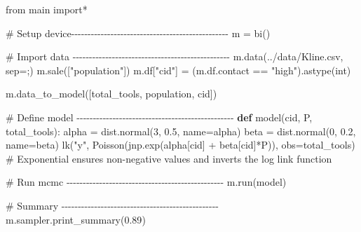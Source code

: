 \documentclass[
  letterpaper,
  DIV=11,
  numbers=noendperiod]{scrreprt}
\newenvironment{Shaded}{\begin{snugshade}}{\end{snugshade}}
\newcommand{\BuiltInTok}[1]{\textcolor[rgb]{0.00,0.23,0.31}{#1}}
\newcommand{\CommentTok}[1]{\textcolor[rgb]{0.37,0.37,0.37}{#1}}
\newcommand{\DecValTok}[1]{\textcolor[rgb]{0.68,0.00,0.00}{#1}}
\newcommand{\FloatTok}[1]{\textcolor[rgb]{0.68,0.00,0.00}{#1}}
\newcommand{\ImportTok}[1]{\textcolor[rgb]{0.00,0.46,0.62}{#1}}
\newcommand{\KeywordTok}[1]{\textcolor[rgb]{0.00,0.23,0.31}{\textbf{#1}}}
\newcommand{\NormalTok}[1]{\textcolor[rgb]{0.00,0.23,0.31}{#1}}
\newcommand{\OperatorTok}[1]{\textcolor[rgb]{0.37,0.37,0.37}{#1}}
\newcommand{\StringTok}[1]{\textcolor[rgb]{0.13,0.47,0.30}{#1}}
\begin{document}
\begin{Shaded}
\begin{Highlighting}[]
\ImportTok{from}\NormalTok{ main }\ImportTok{import}\OperatorTok{*}

\CommentTok{\# Setup device{-}{-}{-}{-}{-}{-}{-}{-}{-}{-}{-}{-}{-}{-}{-}{-}{-}{-}{-}{-}{-}{-}{-}{-}{-}{-}{-}{-}{-}{-}{-}{-}{-}{-}{-}{-}{-}{-}{-}{-}{-}{-}{-}{-}{-}{-}{-}{-}}
\NormalTok{m }\OperatorTok{=}\NormalTok{ bi()}

\CommentTok{\# Import data {-}{-}{-}{-}{-}{-}{-}{-}{-}{-}{-}{-}{-}{-}{-}{-}{-}{-}{-}{-}{-}{-}{-}{-}{-}{-}{-}{-}{-}{-}{-}{-}{-}{-}{-}{-}{-}{-}{-}{-}{-}{-}{-}{-}{-}{-}{-}{-}}
\NormalTok{m.data(}\StringTok{\textquotesingle{}../data/Kline.csv\textquotesingle{}}\NormalTok{, sep}\OperatorTok{=}\StringTok{\textquotesingle{};\textquotesingle{}}\NormalTok{) }
\NormalTok{m.sale([}\StringTok{"population"}\NormalTok{]) }
\NormalTok{m.df[}\StringTok{"cid"}\NormalTok{] }\OperatorTok{=}\NormalTok{ (m.df.contact }\OperatorTok{==} \StringTok{"high"}\NormalTok{).astype(}\BuiltInTok{int}\NormalTok{)}

\NormalTok{m.data\_to\_model([}\StringTok{\textquotesingle{}total\_tools\textquotesingle{}}\NormalTok{, }\StringTok{\textquotesingle{}population\textquotesingle{}}\NormalTok{, }\StringTok{\textquotesingle{}cid\textquotesingle{}}\NormalTok{])}


\CommentTok{\# Define model {-}{-}{-}{-}{-}{-}{-}{-}{-}{-}{-}{-}{-}{-}{-}{-}{-}{-}{-}{-}{-}{-}{-}{-}{-}{-}{-}{-}{-}{-}{-}{-}{-}{-}{-}{-}{-}{-}{-}{-}{-}{-}{-}{-}{-}{-}{-}{-}}
\KeywordTok{def}\NormalTok{ model(cid, P, total\_tools):}
\NormalTok{    alpha }\OperatorTok{=}\NormalTok{ dist.normal(}\DecValTok{3}\NormalTok{, }\FloatTok{0.5}\NormalTok{, name}\OperatorTok{=}\StringTok{\textquotesingle{}alpha\textquotesingle{}}\NormalTok{)}
\NormalTok{    beta }\OperatorTok{=}\NormalTok{ dist.normal(}\DecValTok{0}\NormalTok{, }\FloatTok{0.2}\NormalTok{, name}\OperatorTok{=}\StringTok{\textquotesingle{}beta\textquotesingle{}}\NormalTok{)}
\NormalTok{    lk(}\StringTok{"y"}\NormalTok{, Poisson(jnp.exp(alpha[cid] }\OperatorTok{+}\NormalTok{ beta[cid]}\OperatorTok{*}\NormalTok{P)), obs}\OperatorTok{=}\NormalTok{total\_tools)  }\CommentTok{\# Exponential ensures non{-}negative values and inverts the log link function}

\CommentTok{\# Run mcmc {-}{-}{-}{-}{-}{-}{-}{-}{-}{-}{-}{-}{-}{-}{-}{-}{-}{-}{-}{-}{-}{-}{-}{-}{-}{-}{-}{-}{-}{-}{-}{-}{-}{-}{-}{-}{-}{-}{-}{-}{-}{-}{-}{-}{-}{-}{-}{-}}
\NormalTok{m.run(model) }

\CommentTok{\# Summary {-}{-}{-}{-}{-}{-}{-}{-}{-}{-}{-}{-}{-}{-}{-}{-}{-}{-}{-}{-}{-}{-}{-}{-}{-}{-}{-}{-}{-}{-}{-}{-}{-}{-}{-}{-}{-}{-}{-}{-}{-}{-}{-}{-}{-}{-}{-}{-}}
\NormalTok{m.sampler.print\_summary(}\FloatTok{0.89}\NormalTok{)}
\end{Highlighting}
\end{Shaded}
\end{document}
